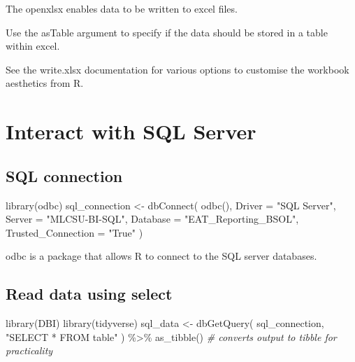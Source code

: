 \documentclass[
]{book}
\newenvironment{Shaded}{\begin{snugshade}}{\end{snugshade}}
\newcommand{\AttributeTok}[1]{\textcolor[rgb]{0.77,0.63,0.00}{#1}}
\newcommand{\CommentTok}[1]{\textcolor[rgb]{0.56,0.35,0.01}{\textit{#1}}}
\newcommand{\FunctionTok}[1]{\textcolor[rgb]{0.00,0.00,0.00}{#1}}
\newcommand{\NormalTok}[1]{#1}
\newcommand{\OtherTok}[1]{\textcolor[rgb]{0.56,0.35,0.01}{#1}}
\newcommand{\SpecialCharTok}[1]{\textcolor[rgb]{0.00,0.00,0.00}{#1}}
\newcommand{\StringTok}[1]{\textcolor[rgb]{0.31,0.60,0.02}{#1}}
\begin{document}
The openxlsx enables data to be written to excel files.

Use the asTable argument to specify if the data should be stored in a table within excel.

See the write.xlsx documentation for various options to customise the workbook aesthetics from R.

\hypertarget{interact-with-sql-server}{%
\chapter{Interact with SQL Server}\label{interact-with-sql-server}}

\hypertarget{sql-connection}{%
\section{SQL connection}\label{sql-connection}}

\begin{Shaded}
\begin{Highlighting}[]
\FunctionTok{library}\NormalTok{(odbc)}
\NormalTok{sql\_connection }\OtherTok{\textless{}{-}}
  \FunctionTok{dbConnect}\NormalTok{(}
    \FunctionTok{odbc}\NormalTok{(),}
    \AttributeTok{Driver =} \StringTok{"SQL Server"}\NormalTok{,}
    \AttributeTok{Server =} \StringTok{"MLCSU{-}BI{-}SQL"}\NormalTok{,}
    \AttributeTok{Database =} \StringTok{"EAT\_Reporting\_BSOL"}\NormalTok{,}
    \AttributeTok{Trusted\_Connection =} \StringTok{"True"}
\NormalTok{  )}
\end{Highlighting}
\end{Shaded}

odbc is a package that allows R to connect to the SQL server databases.

\hypertarget{read-data-using-select}{%
\section{Read data using select}\label{read-data-using-select}}

\begin{Shaded}
\begin{Highlighting}[]
\FunctionTok{library}\NormalTok{(DBI)}
\FunctionTok{library}\NormalTok{(tidyverse)}
\NormalTok{sql\_data }\OtherTok{\textless{}{-}} 
  \FunctionTok{dbGetQuery}\NormalTok{(}
\NormalTok{    sql\_connection,}
    \StringTok{"SELECT *}
\StringTok{    FROM table"}
\NormalTok{  ) }\SpecialCharTok{\%\textgreater{}\%} \FunctionTok{as\_tibble}\NormalTok{() }\CommentTok{\# converts output to tibble for practicality}
\end{Highlighting}
\end{Shaded}
\end{document}
